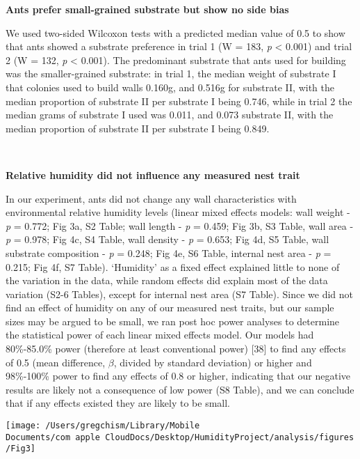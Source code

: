 \documentclass[3p]{elsarticle} %
\begin{document}
\textbf{Ants prefer small-grained substrate but show no side bias}

We used two-sided Wilcoxon tests with a predicted median value of 0.5 to
show that ants showed a substrate preference in trial 1 (W = 183,
\emph{p} \textless{} 0.001) and trial 2 (W = 132, \emph{p} \textless{}
0.001). The predominant substrate that ants used for building was the
smaller-grained substrate: in trial 1, the median weight of substrate I
that colonies used to build walls 0.160g, and 0.516g for substrate II,
with the median proportion of substrate II per substrate I being 0.746,
while in trial 2 the median grams of substrate I used was 0.011, and
0.073 substrate II, with the median proportion of substrate II per
substrate I being 0.849.

~

\textbf{Relative humidity did not influence any measured nest trait}

In our experiment, ants did not change any wall characteristics with
environmental relative humidity levels (linear mixed effects models:
wall weight - \emph{p} = 0.772; Fig 3a, S2 Table; wall length - \emph{p}
= 0.459; Fig 3b, S3 Table, wall area - \emph{p} = 0.978; Fig 4c, S4
Table, wall density - \emph{p} = 0.653; Fig 4d, S5 Table, wall substrate
composition - \emph{p} = 0.248; Fig 4e, S6 Table, internal nest area -
\emph{p} = 0.215; Fig 4f, S7 Table). `Humidity' as a fixed effect
explained little to none of the variation in the data, while random
effects did explain most of the data variation (S2-6 Tables), except for
internal nest area (S7 Table). Since we did not find an effect of
humidity on any of our measured nest traits, but our sample sizes may be
argued to be small, we ran post hoc power analyses to determine the
statistical power of each linear mixed effects model. Our models had
80\%-85.0\% power (therefore at least conventional power) {[}38{]} to
find any effects of 0.5 (mean difference, \(\beta\), divided by standard
deviation) or higher and 98\%-100\% power to find any effects of 0.8 or
higher, indicating that our negative results are likely not a
consequence of low power (S8 Table), and we can conclude that if any
effects existed they are likely to be small.

\begin{flushleft}\texttt{[image: /Users/gregchism/Library/Mobile Documents/com~apple~CloudDocs/Desktop/HumidityProject/analysis/figures/Fig3]} \end{flushleft}
\end{document}
